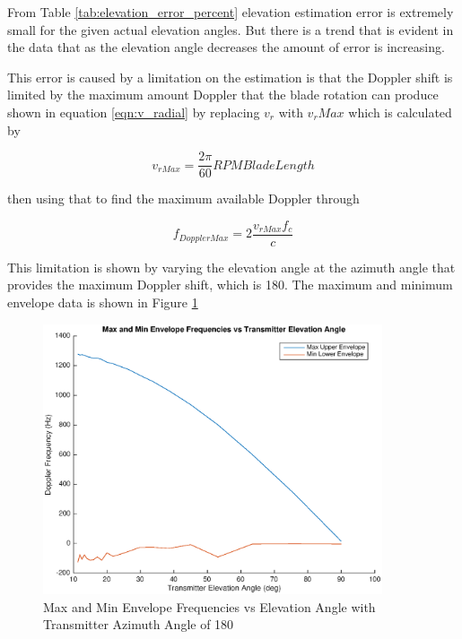 From Table \ref{tab:elevation_error_percent} elevation estimation error is extremely small for the given actual elevation angles. But there is a trend that is evident in the data that as the elevation angle decreases the amount of error is increasing.


This error is caused by a limitation on the estimation is that the Doppler shift is limited by the maximum amount Doppler that the blade rotation can produce shown in equation \ref{eqn:v_radial} by replacing $v_r$ with $v_rMax$ which is calculated by

\begin{equation}
	v_{rMax} = \frac{2\pi}{60} RPM BladeLength
	\label{eqn:v_radial_max}
\end{equation}

then using that to find the maximum available Doppler through

\begin{equation}
	f_{DopplerMax} = 2\frac{v_{rMax} f_c}{c}
	\label{eqn:fd_max}
\end{equation}

This limitation is shown by varying the elevation angle at the azimuth angle that provides the maximum Doppler shift, which is 180\textdegree \space. The maximum and minimum envelope data is shown in Figure \ref{fig:envelope_180deg}

\begin{figure}
	\begin{center}
		\includegraphics[width=10cm]{images/results/Elevation_angle_envelopes_180deg_Azimuth.eps}
		\caption{Max and Min Envelope Frequencies vs Elevation Angle with Transmitter Azimuth Angle of 180\textdegree}
		\label{fig:envelope_180deg}
	\end{center}
\end{figure}

